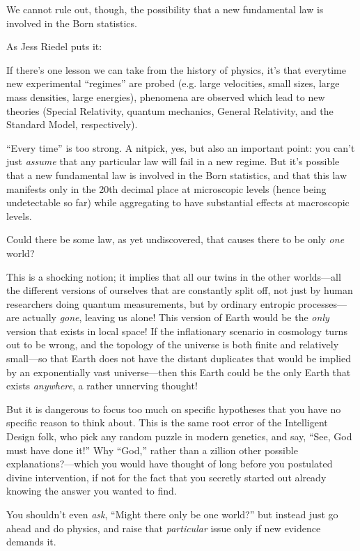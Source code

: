 {
 We cannot rule out, though, the possibility that a new fundamental
law is involved in the Born statistics.}

{
 As Jess Riedel puts it:}

{
 If there's one lesson we can take from the history
of physics, it's that everytime new experimental
``regimes'' are probed (e.g. large
velocities, small sizes, large mass densities, large energies),
phenomena are observed which lead to new theories (Special Relativity,
quantum mechanics, General Relativity, and the Standard Model,
respectively).}

{
 ``Every time'' is too strong. A
nitpick, yes, but also an important point: you can't
just \textit{assume} that any particular law will fail in a new regime.
But it's possible that a new fundamental law is
involved in the Born statistics, and that this law manifests only in
the 20th decimal place at microscopic levels (hence being undetectable
so far) while aggregating to have substantial effects at macroscopic
levels.}

{
 Could there be some law, as yet undiscovered, that causes there to
be only \textit{one} world?}

{
 This is a shocking notion; it implies that all our twins in the
other worlds---all the different versions of ourselves that are
constantly split off, not just by human researchers doing quantum
measurements, but by ordinary entropic processes---are actually
\textit{gone}, leaving us alone! This version of Earth would be the
\textit{only} version that exists in local space! If the inflationary
scenario in cosmology turns out to be wrong, and the topology of the
universe is both finite and relatively small---so that Earth does not
have the distant duplicates that would be implied by an exponentially
vast universe---then this Earth could be the only Earth that exists
\textit{anywhere}, a rather unnerving thought!}

{
 But it is dangerous to focus too much on specific hypotheses that
you have no specific reason to think about. This is the same root error
of the Intelligent Design folk, who pick any random puzzle in modern
genetics, and say, ``See, God must have done
it!'' Why ``God,''
rather than a zillion other possible explanations?---which you would
have thought of long before you postulated divine intervention, if not
for the fact that you secretly started out already knowing the answer
you wanted to find.}

{
 You shouldn't even \textit{ask},
``Might there only be one world?''
but instead just go ahead and do physics, and raise that
\textit{particular} issue only if new evidence demands it.}

